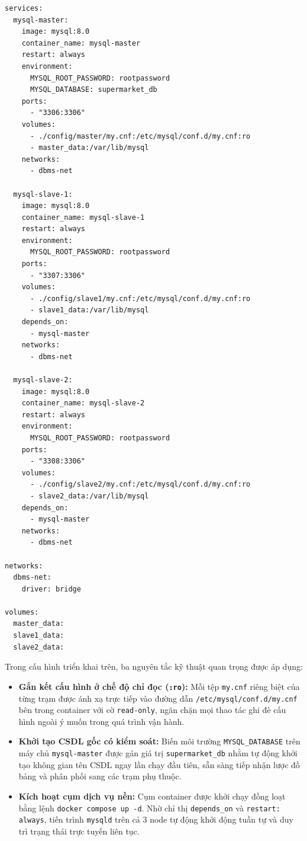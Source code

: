 \documentclass[12pt,a4paper]{report}
\begin{document}
\begin{lstlisting}[caption={Cấu hình triển khai cụm 3 node trong tệp docker-compose.yml}]
services:
  mysql-master:
    image: mysql:8.0
    container_name: mysql-master
    restart: always
    environment:
      MYSQL_ROOT_PASSWORD: rootpassword
      MYSQL_DATABASE: supermarket_db
    ports:
      - "3306:3306"
    volumes:
      - ./config/master/my.cnf:/etc/mysql/conf.d/my.cnf:ro
      - master_data:/var/lib/mysql
    networks:
      - dbms-net

  mysql-slave-1:
    image: mysql:8.0
    container_name: mysql-slave-1
    restart: always
    environment:
      MYSQL_ROOT_PASSWORD: rootpassword
    ports:
      - "3307:3306"
    volumes:
      - ./config/slave1/my.cnf:/etc/mysql/conf.d/my.cnf:ro
      - slave1_data:/var/lib/mysql
    depends_on:
      - mysql-master
    networks:
      - dbms-net

  mysql-slave-2:
    image: mysql:8.0
    container_name: mysql-slave-2
    restart: always
    environment:
      MYSQL_ROOT_PASSWORD: rootpassword
    ports:
      - "3308:3306"
    volumes:
      - ./config/slave2/my.cnf:/etc/mysql/conf.d/my.cnf:ro
      - slave2_data:/var/lib/mysql
    depends_on:
      - mysql-master
    networks:
      - dbms-net

networks:
  dbms-net:
    driver: bridge

volumes:
  master_data:
  slave1_data:
  slave2_data:
\end{lstlisting}

Trong cấu hình triển khai trên, ba nguyên tắc kỹ thuật quan trọng được áp dụng:
\begin{itemize}
    \item \textbf{Gắn kết cấu hình ở chế độ chỉ đọc (\texttt{:ro}):} Mỗi tệp \texttt{my.cnf} riêng biệt của từng trạm được ánh xạ trực tiếp vào đường dẫn \texttt{/etc/mysql/conf.d/my.cnf} bên trong container với cờ \texttt{read-only}, ngăn chặn mọi thao tác ghi đè cấu hình ngoài ý muốn trong quá trình vận hành.
    \item \textbf{Khởi tạo CSDL gốc có kiểm soát:} Biến môi trường \texttt{MYSQL\_DATABASE} trên máy chủ \texttt{mysql-master} được gán giá trị \texttt{supermarket\_db} nhằm tự động khởi tạo không gian tên CSDL ngay lần chạy đầu tiên, sẵn sàng tiếp nhận lược đồ bảng và phân phối sang các trạm phụ thuộc.
    \item \textbf{Kích hoạt cụm dịch vụ nền:} Cụm container được khởi chạy đồng loạt bằng lệnh \texttt{docker compose up -d}. Nhờ chỉ thị \texttt{depends\_on} và \texttt{restart: always}, tiến trình \texttt{mysqld} trên cả 3 node tự động khởi động tuần tự và duy trì trạng thái trực tuyến liên tục.
\end{itemize}
\end{document}
